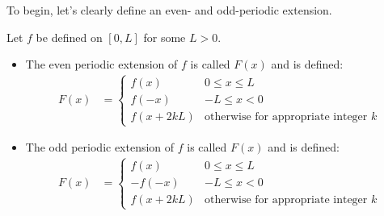 To begin, let's clearly define an even- and odd-periodic extension.  

\begin{definition}
Let $f$ be defined on $[0,L]$ for some $L>0$.  
\begin{itemize}
\item The even periodic extension of $f$ is called $F(x)$ and is defined:
% 
\begin{align*}
F(x) & = 
\begin{cases}
f(x) & 0 \leq x \leq L \\
f(-x) &  -L \leq x < 0 \\
f(x+2kL) & \text{otherwise for appropriate integer $k$}
\end{cases}
\end{align*}
\item The odd periodic extension of $f$ is called $F(x)$ and is defined:
\begin{align*}
F(x) & =
\begin{cases}
f(x) & 0 \leq x \leq L \\
-f(-x) &  -L \leq x < 0 \\
f(x+2kL) & \text{otherwise for appropriate integer $k$}
\end{cases}
\end{align*}
\end{itemize}
\end{definition}

